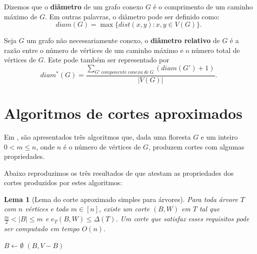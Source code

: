 \documentclass[a4paper,12pt]{article}
\newtheorem{lem}{Lema}
\begin{document}
	\bigskip
	\bigskip
	\bigskip
	\bigskip
	\bigskip
	\bigskip



	Dizemos que o \textbf{diâmetro} de um grafo conexo $G$ é o
	comprimento de um caminho máximo de $G$. 
	Em outras palavras, o diâmetro pode ser definido como:
	$$ diam(G)=\max\{dist(x,y):x,y\in V(G)\}. $$

	\bigskip

	Seja $G$ um grafo não necessariamente conexo,
	o \textbf{diâmetro relativo} de $G$
	 é a razão entre o número
	de vértices de um caminho máximo e o número total de vértices
	de $G$. Este pode também ser representado por
	$$ diam^*(G) = \frac{\displaystyle\sum_{
	G'~componente~conexa~de~G}^{}(diam(G')+1)}{|V(G)|}. $$
    
\newpage
\section {Algoritmos de cortes aproximados}

Em \cite{Schmidt15}, são apresentados três algoritmos que, dada uma 
floresta $G$ e um inteiro $0<m\le n$, onde $n$ é o número de vértices 
de $G$, produzem cortes com algumas propriedades.

Abaixo reproduzimos os três resultados de \cite{Schmidt15} que 
atestam as propriedades dos cortes produzidos por estes algoritmos:

\bigskip
\bigskip
\bigskip
\bigskip

\begin{lem}[Lema do corte aproximado simples para árvores]

	Para toda árvore $T$ com $n$ vértices e todo $m \in [n]$,
	existe um corte $(B,W)$ em $T$ tal que 
	$\frac{m}{2} <|B| \le m$ e
	$e_T(B,W) \le \Delta(T)$.
	Um corte que satisfaz esses requisitos pode ser computado em
	tempo $O(n)$.
\end{lem}

\medskip

\begin{algorithm}[H]

	\caption{Computa corte aproximado}
	$B \gets \emptyset$\;
	{
	}
	\Return $(B,V-B)$

\end{algorithm}	
\end{document}
